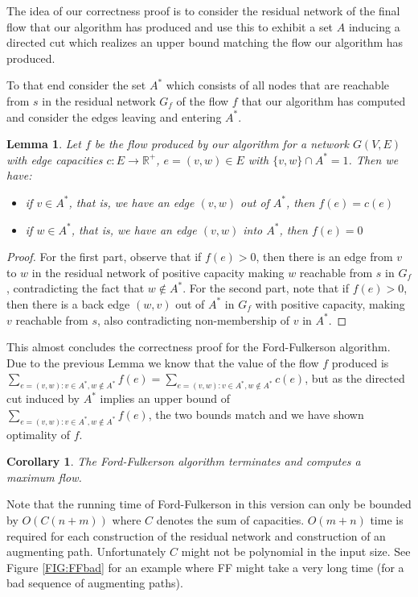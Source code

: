 \documentclass{article}
\newtheorem{lemma}{Lemma}
\newtheorem{corollary}{Corollary}
\begin{document}
The idea of our correctness proof is to consider the residual network of the final flow that our algorithm has produced and use this to exhibit a set $A$ inducing a directed cut which realizes an upper bound matching the flow our algorithm has produced.

To that end consider the set $A^*$ which consists of all nodes that are reachable from $s$ in the residual network $G_f$ of the flow $f$ that our algorithm has computed and consider the edges leaving and entering $A^*$.
\begin{lemma}
Let $f$ be the flow produced by our algorithm for a network $G(V,E)$ with edge capacities $c:E\rightarrow \mathbb{R}^+$, $e=(v,w)\in E$ with $\{v,w\}\cap A^*=1$. Then we have:
\begin{itemize}
\item if $v\in A^*$, that is, we have an edge $(v,w)$ out of  $A^*$, then $f(e)=c(e)$
\item if $w\in A^*$, that is, we have an edge $(v,w)$ into $A^*$, then $f(e)=0$ 
\end{itemize}
\end{lemma}
\begin{proof}
For the first part, observe that if $f(e)>0$, then there is an edge from $v$ to $w$ in the residual network of positive capacity making $w$ reachable from $s$ in $G_f$, contradicting the fact that $w\notin A^*$.
For the second part, note that if $f(e)>0$, then there is a back edge $(w,v)$ out of $A^*$ in $G_f$ with positive capacity, making $v$ reachable from $s$, also contradicting non-membership of $v$ in $A^*$.
\end{proof}

This almost concludes the correctness proof for the Ford-Fulkerson algorithm. Due to the previous Lemma we know that the value of the flow $f$ produced is $\displaystyle \sum_{e=(v,w): v\in A^*, w\notin A^*} f(e)=\sum_{e=(v,w): v\in A^*, w\notin A^*} c(e)$, but as the directed cut induced by $A^*$ implies an upper bound of\\ $\displaystyle\sum_{e=(v,w): v\in A^*, w\notin A^*} f(e)$, the two bounds match and we have shown optimality of $f$.

\begin{corollary}
The Ford-Fulkerson algorithm terminates and computes a maximum flow.
\end{corollary}

Note that the running time of Ford-Fulkerson in this version can only be bounded by $O(C(n+m))$ where $C$ denotes the sum of capacities. $O(m+n)$ time is required for each construction of the residual network and construction of an augmenting path. Unfortunately $C$ might not be polynomial in the input size. See Figure \ref{FIG:FFbad} for an example where FF might take a very long time (for a bad sequence of augmenting paths).
\end{document}
